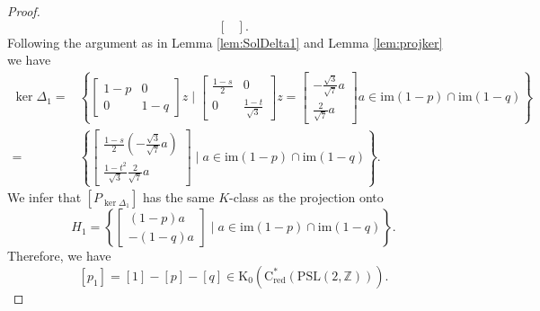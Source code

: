 \documentclass[a4paper,leqno,12pt]{article}
\numberwithin{equation}{section}
\theoremstyle{plain}
\theoremstyle{definition}
\theoremstyle{remark}
\newtheorem{remark}[theoremcounter]{Remark}
\newcommand{\Cs}{\mathrm{C}^*}
\newcommand{\Csr}{\mathrm{C}^*_{\text{red}}}
\begin{document}
\begin{proof}
\[\begin{bmatrix}
		\end{bmatrix}.
		\]
		Following the argument as in Lemma \ref{lem:SolDelta1} and Lemma \ref{lem:projker} we have 
		\begin{align*}
			\ker\Delta_1=&\left\{
			\begin{bmatrix}1-p & 0\\ 0& 1-q\end{bmatrix}z \mid \begin{bmatrix}\frac{1-s}{2} & 0\\ 0& \frac{1-t}{\sqrt 3}\end{bmatrix}z=\begin{bmatrix}-\frac{\sqrt 3}{\sqrt 7}a\\ \frac{2}{\sqrt 7}a\end{bmatrix}
			a\in \mathrm{im}(1-p)\cap\mathrm{im}(1-q)
			\right\}\\
			=&
			\left\{
			\begin{bmatrix}\frac{1-s}{2}(-\frac{\sqrt 3}{\sqrt 7}a) \\ \frac{1-t^2}{\sqrt 3}\frac{2}{\sqrt 7}a \end{bmatrix} \mid 
			a\in\mathrm{im}(1-p)\cap\mathrm{im}(1-q) 
			\right\}.
		\end{align*}
	We infer that
		$[P_{\ker\Delta_1}]$ has the same  $K$-class as  the projection onto 
		\[
		H_1 =  \left\{
		\begin{bmatrix}(1-p)a\\ -(1-q)a\end{bmatrix} \mid a\in \mathrm{im}(1-p)\cap\mathrm{im}(1-q)
		\right\}.
		\]
		Therefore, we have
		\[
		[p_1]=[1]-[p]-[q]\in \mathrm K_0(\Csr(\mathrm{PSL}(2, \mathbb Z))).
		\]
	\end{proof}
	
	
\end{document}
